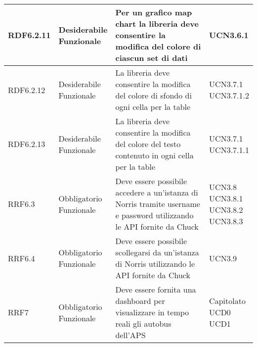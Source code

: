 \begin{longtabu}[c]{|X[0.7,l]|X[l]|X[2.5,l]|X[l]|}
                RDF6.2.11 & 
                \parbox[t]{4cm}{ Desiderabile \\ Funzionale} & Per un grafico map chart la libreria deve consentire la modifica del colore di ciascun set di dati & \parbox[t]{4cm}{UCN3.6.1 }  \\ 
                \hline
                
                RDF6.2.12 & 
                \parbox[t]{4cm}{ Desiderabile \\ Funzionale} & La libreria deve consentire la modifica del colore di sfondo di ogni cella per la table & \parbox[t]{4cm}{UCN3.7.1 \\ UCN3.7.1.2 }  \\ 
                \hline
                
                RDF6.2.13 & 
                \parbox[t]{4cm}{ Desiderabile \\ Funzionale} & La libreria deve consentire la modifica del colore del testo contenuto in ogni cella per la table & \parbox[t]{4cm}{UCN3.7.1 \\ UCN3.7.1.1 }  \\ 
                \hline
                
                RRF6.3 & 
                \parbox[t]{4cm}{ Obbligatorio \\ Funzionale} & Deve essere possibile accedere a un'istanza di Norris tramite username e password utilizzando le API fornite da Chuck & \parbox[t]{4cm}{UCN3.8 \\ UCN3.8.1 \\ UCN3.8.2 \\ UCN3.8.3 }  \\ 
                \hline
                
                RRF6.4 & 
                \parbox[t]{4cm}{ Obbligatorio \\ Funzionale} & Deve essere possibile scollegarsi da un'istanza di Norris utilizzando le API fornite da Chuck & \parbox[t]{4cm}{UCN3.9 }  \\ 
                \hline
                
                RRF7 & 
                \parbox[t]{4cm}{ Obbligatorio \\ Funzionale} & Deve essere fornita una dashboard per visualizzare in tempo reali gli autobus dell'APS & \parbox[t]{4cm}{Capitolato \\ UCD0 \\ UCD1 }  \\ 
                \hline
                

\end{longtabu}
